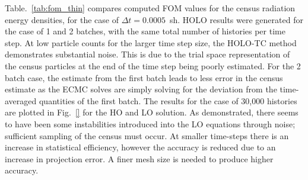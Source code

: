 \documentclass{anstrans}
\renewcommand{\ss}{\ensuremath{\|s\|}}
\begin{document}
Table.~\ref{tab:fom_thin} compares computed FOM values for the census
radiation energy densities, for the case of $\Delta t =
0.0005$~sh.  HOLO results were generated for the case of 1 and 2 batches, with the same
total number of histories per time step.  At low particle counts for the larger time step
size, the HOLO-TC method
demonstrates substantial noise.  This is due to the trial space representation of the
census particles at the end of the time step being poorly estimated.  For the 2 batch
case, the estimate from the first batch leads to less error in the census estimate as the
ECMC solves are simply solving for the deviation from the time-averaged quantities of the first
batch.  The results for the case of 30,000 histories are plotted in Fig.~\ref{} for the HO and LO
solution.  As demonstrated, there seems to have been some instabilities introduced into the LO
equations through noise; sufficient sampling of the census must occur.  At smaller time-steps there
is an increase in statistical efficiency, however the accuracy is reduced due to an
increase in projection error. A finer mesh size is needed to produce higher accuracy.

\end{document}

